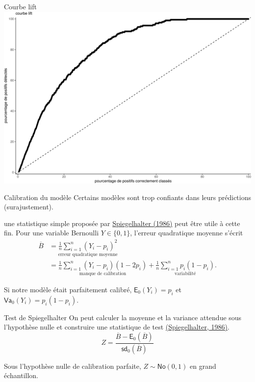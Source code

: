 \documentclass[
  ignorenonframetext,
]{beamer}
\begin{document}
\begin{frame}{Courbe lift}
\protect\hypertarget{courbe-lift-1}{}
\includegraphics{MATH60602-diapos7_files/figure-beamer/figcourbe-lift-pr-1.pdf}
\end{frame}

\begin{frame}{Calibration du modèle}
\protect\hypertarget{calibration-du-moduxe8le}{}
Certains modèles sont trop confiants dans leurs prédictions
(surajustement).

une statistique simple proposée par
\href{https://doi.org/10.1002/sim.4780050506}{Spiegelhalter (1986)} peut
être utile à cette fin. Pour une variable Bernoulli \(Y \in \{0,1\}\),
l'erreur quadratique moyenne s'écrit \begin{align*}
\overline{B} &= \underset{\text{erreur quadratique moyenne}}{\frac{1}{n} \sum_{i=1}^n (Y_i-p_i)^2}
\\&=\underset{\text{manque de calibration}}{\frac{1}{n} \sum_{i=1}^n(Y_i-p_i)(1-2p_i)} + \underset{\text{variabilité}}{\frac{1}{n} \sum_{i=1}^n p_i(1-p_i)}.
\end{align*}

Si notre modèle était parfaitement calibré, \(\mathsf{E}_0(Y_i)=p_i\) et
\(\mathsf{Va}_0(Y_i) = p_i(1-p_i)\).
\end{frame}

\begin{frame}{Test de Spiegelhalter}
\protect\hypertarget{test-de-spiegelhalter}{}
On peut calculer la moyenne et la variance attendue sous l'hypothèse
nulle et construire une statistique de test
\href{https://doi.org/10.1002/sim.4780050506}{(Spiegelhalter, 1986)}.
\[Z = \frac{\overline{B} -\mathsf{E}_0(\overline{B})}{\mathsf{sd}_0(\overline{B})}\]

Sous l'hypothèse nulle de calibration parfaite,
\(Z \sim \mathsf{No}(0,1)\) en grand échantillon.
\end{frame}
\end{document}
